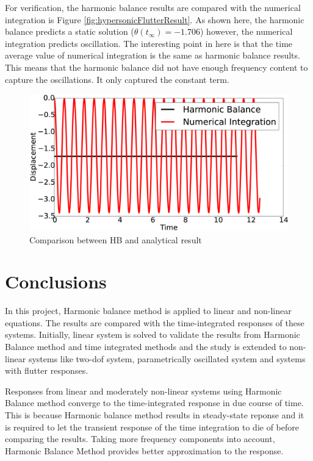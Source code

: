 \documentclass[12pt, a4paper]{extarticle}
\begin{document}
For verification, the harmonic balance results are compared with the numerical integration is Figure \eqref{fig:hypersonicFlutterResult}. As shown here, the harmonic balance predicts a static solution ($\theta(t_\infty) = -1.706$) however, the numerical integration predicts oscillation. The interesting point in here is that the time average value of numerical integration is the same as harmonic balance results. This means that the harmonic balance did not have enough frequency content to capture the oscillations. It only captured the constant term.

\begin{figure}[h]
	\centering
	\includegraphics[width=12.0 cm]{figure/4N9.eps}
	\caption{Comparison between HB and analytical result}
	\label{fig:hypersonicFlutterResult}
\end{figure}

\section{Conclusions}

In this project, Harmonic balance method is applied to linear and non-linear equations. The results are compared with the time-integrated responses of these systems. Initially, linear system is solved to validate the results from Harmonic Balance method and time integrated methods and the study is extended to non-linear systems like two-dof system, parametrically oscillated system and systems with flutter responses. 

Responses from linear and moderately non-linear systems using Harmonic Balance method converge to the time-integrated response in due course of time. This is because Harmonic balance method results in steady-state reponse and it is required to let the transient response of the time integration to die of before comparing the results. Taking more frequency components into account, Harmonic Balance Method provides better approximation to the response. 
\end{document}
